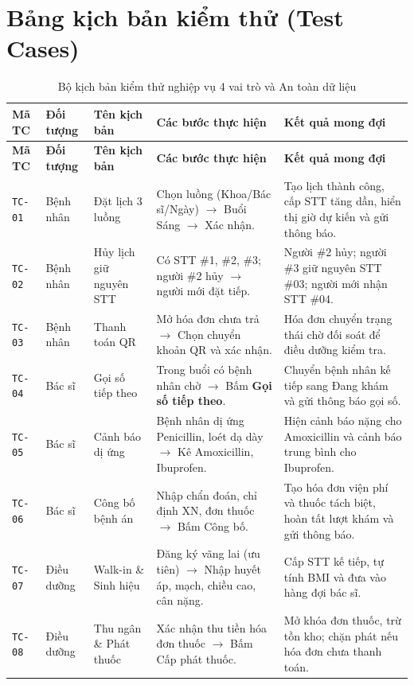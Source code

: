 \documentclass[12pt,a4paper]{report}
\begin{document}
\section{Bảng kịch bản kiểm thử (Test Cases)}

\begin{longtable}{@{}p{1.45cm} p{2.05cm} p{2.85cm} p{3.95cm} p{3.95cm}@{}}
  \caption{Bộ kịch bản kiểm thử nghiệp vụ 4 vai trò và An toàn dữ liệu} \label{tab:testcases} \\
  \toprule
  \textbf{Mã TC} & \textbf{Đối tượng} & \textbf{Tên kịch bản} & \textbf{Các bước thực hiện} & \textbf{Kết quả mong đợi} \\
  \midrule
  \endfirsthead
  \toprule
  \textbf{Mã TC} & \textbf{Đối tượng} & \textbf{Tên kịch bản} & \textbf{Các bước thực hiện} & \textbf{Kết quả mong đợi} \\
  \midrule
  \endhead
  \bottomrule
  \endfoot
  \texttt{TC-01} & Bệnh nhân & Đặt lịch 3 luồng & Chọn luồng (Khoa/Bác sĩ/Ngày) $\rightarrow$ Buổi Sáng $\rightarrow$ Xác nhận. & Tạo lịch thành công, cấp STT tăng dần, hiển thị giờ dự kiến và gửi thông báo. \\
  \texttt{TC-02} & Bệnh nhân & Hủy lịch giữ nguyên STT & Có STT \#1, \#2, \#3; người \#2 hủy $\rightarrow$ người mới đặt tiếp. & Người \#2 hủy; người \#3 giữ nguyên STT \#03; người mới nhận STT \#04. \\
  \texttt{TC-03} & Bệnh nhân & Thanh toán QR & Mở hóa đơn chưa trả $\rightarrow$ Chọn chuyển khoản QR và xác nhận. & Hóa đơn chuyển trạng thái chờ đối soát để điều dưỡng kiểm tra. \\
  \texttt{TC-04} & Bác sĩ & Gọi số tiếp theo & Trong buổi có bệnh nhân chờ $\rightarrow$ Bấm \textbf{Gọi số tiếp theo}. & Chuyển bệnh nhân kế tiếp sang Đang khám và gửi thông báo gọi số. \\
  \texttt{TC-05} & Bác sĩ & Cảnh báo dị ứng & Bệnh nhân dị ứng Penicillin, loét dạ dày $\rightarrow$ Kê Amoxicillin, Ibuprofen. & Hiện cảnh báo nặng cho Amoxicillin và cảnh báo trung bình cho Ibuprofen. \\
  \texttt{TC-06} & Bác sĩ & Công bố bệnh án & Nhập chẩn đoán, chỉ định XN, đơn thuốc $\rightarrow$ Bấm Công bố. & Tạo hóa đơn viện phí và thuốc tách biệt, hoàn tất lượt khám và gửi thông báo. \\
  \texttt{TC-07} & Điều dưỡng & Walk-in \& Sinh hiệu & Đăng ký vãng lai (ưu tiên) $\rightarrow$ Nhập huyết áp, mạch, chiều cao, cân nặng. & Cấp STT kế tiếp, tự tính BMI và đưa vào hàng đợi bác sĩ. \\
  \texttt{TC-08} & Điều dưỡng & Thu ngân \& Phát thuốc & Xác nhận thu tiền hóa đơn thuốc $\rightarrow$ Bấm Cấp phát thuốc. & Mở khóa đơn thuốc, trừ tồn kho; chặn phát nếu hóa đơn chưa thanh toán. \\

\end{longtable}
\end{document}
